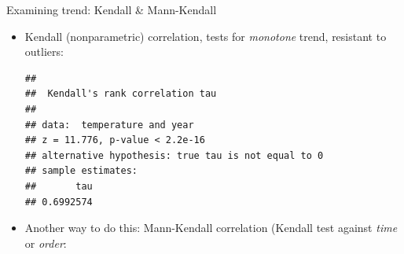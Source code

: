 \begin{frame}[fragile]{Examining trend: Kendall \& Mann-Kendall}
  
  
  \begin{itemize}
\item Kendall (nonparametric) correlation, tests for \emph{monotone}
  trend, resistant to outliers:

{\small  
\begin{knitrout}
\color{fgcolor}\begin{kframe}
\begin{alltt}
\hlstd{=}\hlstd{)}
\end{alltt}
\begin{verbatim}
## 
## 	Kendall's rank correlation tau
## 
## data:  temperature and year
## z = 11.776, p-value < 2.2e-16
## alternative hypothesis: true tau is not equal to 0
## sample estimates:
##       tau 
## 0.6992574
\end{verbatim}
\end{kframe}
\end{knitrout}
}

\item Another way to do this: Mann-Kendall correlation (Kendall test
  against \emph{time} or \emph{order}:
 
{\small  
\begin{knitrout}
\color{fgcolor}\begin{kframe}
\begin{alltt}
\end{alltt}


{\ttfamily\noindent\bfseries\color{errorcolor}{\#\# Error in library(Kendall): there is no package called 'Kendall'}}\begin{alltt}
\end{alltt}


{\ttfamily\noindent\bfseries{}}\end{kframe}
\end{knitrout}
}
  \end{itemize}
\end{frame}


